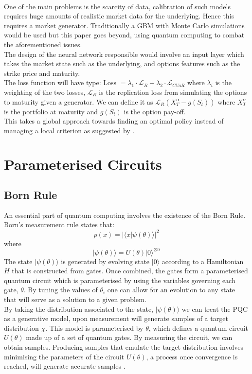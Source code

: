 \documentclass[12pt]{article}
\numberwithin{equation}{section}
\begin{document}
\\
One of the main problems is the scarcity of data, calibration of such models 
requires huge amounts of realistic market data for the underlying. Hence this
requires a market generator. Traditionally a GBM with Monte Carlo simulations 
would be used but this paper goes beyond, using quantum computing to combat the 
aforementioned issues. 
\\
The design of the neural network responsible would involve an input layer which
takes the market state such as the underlying, and options features such as the 
strike price and maturity.\\
The loss function will have
type: $\text{Loss }=\lambda_1\cdot\mathcal{L}_R + \lambda_2 \cdot \mathcal{L}_{CVaR}$
where $\lambda_i$ is the weighting of the two losses, $\mathcal{L}_R$ 
is the replication loss from simulating the options to maturity given a generator. 
We can define it as $\mathcal{L}_R(X^\alpha_T-g(S_t))$ where $X^\alpha_T$ is the 
portfolio at maturity and $g(S_t)$ is the option pay-off.
\\
This takes a global approach towards finding an optimal policy instead of 
managing a local criterion as suggested by \cite{fecamp_deep_2021}.


\clearpage 
\section{Parameterised Circuits} 
\subsection{Born Rule}
An essential part of quantum computing involves the existence of the Born
Rule. Born's measurement rule states that:
\begin{equation}
p(x) = |\langle x|\psi(\theta)\rangle|^2
\end{equation} where 
\begin{equation}
|\psi(\theta)\rangle = U(\theta)|0\rangle^{\otimes n}
\end{equation}
The state $|\psi(\theta)\rangle$ is generated by evolving state $|0\rangle$
according to a Hamiltonian $H$ that is constructed from gates. Once combined, the 
gates form a parameterised quantum circuit which is parameterised by using the 
variables governing each gate, $\theta$. By tuning the values of $\theta_i$ one 
can allow for an evolution to any state that will serve as a solution to a given 
problem. \\ 
By taking the distribution associated to the state, $|\psi(\theta)\rangle$ we can 
treat the PQC as a generative model, upon measurement will 
generate samples of a target distribution $\chi$. This model is parameterised 
by $\theta$, which defines a quantum circuit $U(\theta)$ made up of a set of quantum 
gates.
By measuring the circuit, we can obtain samples. Producing samples that emulate 
the target distribution involves minimising the parameters of the circuit $U(\theta)$, 
a process once convergence is reached, will generate accurate samples 
\cite{liu_differentiable_2018}.
\end{document}
